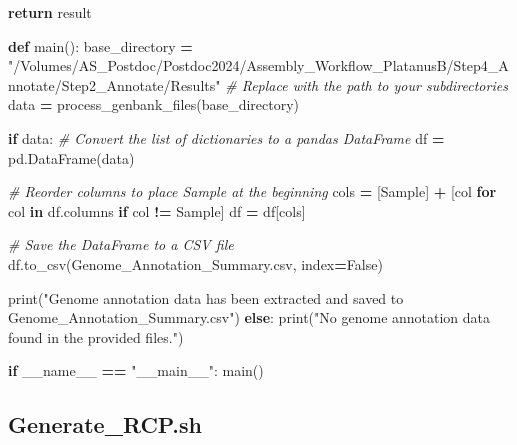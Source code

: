 \documentclass[
]{book}
\newenvironment{Shaded}{\begin{snugshade}}{\end{snugshade}}
\newcommand{\BuiltInTok}[1]{#1}
\newcommand{\CommentTok}[1]{\textcolor[rgb]{0.56,0.35,0.01}{\textit{#1}}}
\newcommand{\ControlFlowTok}[1]{\textcolor[rgb]{0.13,0.29,0.53}{\textbf{#1}}}
\newcommand{\KeywordTok}[1]{\textcolor[rgb]{0.13,0.29,0.53}{\textbf{#1}}}
\newcommand{\NormalTok}[1]{#1}
\newcommand{\OperatorTok}[1]{\textcolor[rgb]{0.81,0.36,0.00}{\textbf{#1}}}
\newcommand{\StringTok}[1]{\textcolor[rgb]{0.31,0.60,0.02}{#1}}
\newcommand{\VariableTok}[1]{\textcolor[rgb]{0.00,0.00,0.00}{#1}}
\begin{document}
\begin{Shaded}
\begin{Highlighting}[]
    \ControlFlowTok{return}\NormalTok{ result}

\KeywordTok{def}\NormalTok{ main():}
\NormalTok{    base\_directory }\OperatorTok{=} \StringTok{"/Volumes/AS\_Postdoc/Postdoc2024/Assembly\_Workflow\_PlatanusB/Step4\_Annotate/Step2\_Annotate/Results"}  \CommentTok{\# Replace with the path to your subdirectories}
\NormalTok{    data }\OperatorTok{=}\NormalTok{ process\_genbank\_files(base\_directory)}
    
    \ControlFlowTok{if}\NormalTok{ data:}
        \CommentTok{\# Convert the list of dictionaries to a pandas DataFrame}
\NormalTok{        df }\OperatorTok{=}\NormalTok{ pd.DataFrame(data)}
        
        \CommentTok{\# Reorder columns to place \textquotesingle{}Sample\textquotesingle{} at the beginning}
\NormalTok{        cols }\OperatorTok{=}\NormalTok{ [}\StringTok{\textquotesingle{}Sample\textquotesingle{}}\NormalTok{] }\OperatorTok{+}\NormalTok{ [col }\ControlFlowTok{for}\NormalTok{ col }\KeywordTok{in}\NormalTok{ df.columns }\ControlFlowTok{if}\NormalTok{ col }\OperatorTok{!=} \StringTok{\textquotesingle{}Sample\textquotesingle{}}\NormalTok{]}
\NormalTok{        df }\OperatorTok{=}\NormalTok{ df[cols]}
        
        \CommentTok{\# Save the DataFrame to a CSV file}
\NormalTok{        df.to\_csv(}\StringTok{\textquotesingle{}Genome\_Annotation\_Summary.csv\textquotesingle{}}\NormalTok{, index}\OperatorTok{=}\VariableTok{False}\NormalTok{)}
        
        \BuiltInTok{print}\NormalTok{(}\StringTok{"Genome annotation data has been extracted and saved to Genome\_Annotation\_Summary.csv"}\NormalTok{)}
    \ControlFlowTok{else}\NormalTok{:}
        \BuiltInTok{print}\NormalTok{(}\StringTok{"No genome annotation data found in the provided files."}\NormalTok{)}

\ControlFlowTok{if} \VariableTok{\_\_name\_\_} \OperatorTok{==} \StringTok{"\_\_main\_\_"}\NormalTok{:}
\NormalTok{    main()}
\end{Highlighting}
\end{Shaded}

\subsection{Generate\_RCP.sh}\label{RCP-script}
\end{document}
